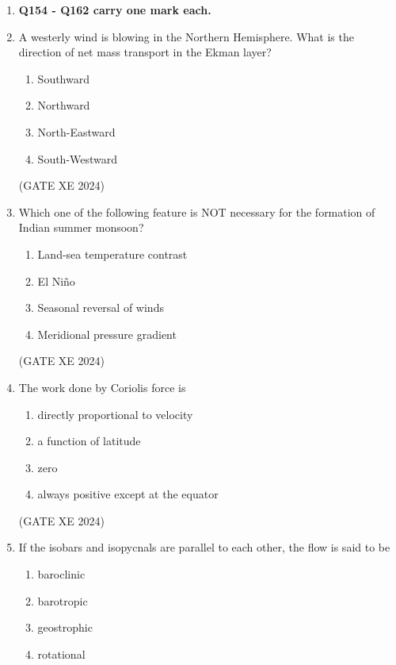 \documentclass[12pt]{article}
\begin{document}
\begin{enumerate}
(GATE XE 2024)

\begin{center}
    \textbf{END OF SECTION - G}
\end{center}

\newpage

\begin{center}
    {\Large \textbf{ATMOSPHERIC AND OCEAN SCIENCE (XE - H)}}
\end{center}

\item[] \textbf{Q154 - Q162 carry one mark each.}
\item A westerly wind is blowing in the Northern Hemisphere. What is the direction of net mass transport in the Ekman layer?  

\begin{enumerate}
\item Southward  
\item Northward  
\item North-Eastward  
\item South-Westward  
\end{enumerate}

(GATE XE 2024)

\item Which one of the following feature is NOT necessary for the formation of Indian summer monsoon?  

\begin{enumerate}
\item Land-sea temperature contrast  
\item El Niño  
\item Seasonal reversal of winds  
\item Meridional pressure gradient  
\end{enumerate}

(GATE XE 2024)

\item The work done by Coriolis force is  

\begin{enumerate}
\item directly proportional to velocity  
\item a function of latitude  
\item zero  
\item always positive except at the equator  
\end{enumerate}

(GATE XE 2024)

\item If the isobars and isopycnals are parallel to each other, the flow is said to be  
\begin{enumerate}
\item baroclinic  
\item barotropic  
\item geostrophic  
\item rotational  
\end{enumerate}


\end{enumerate}
\end{document}
